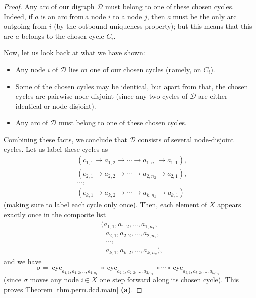 \begin{proof}
Any arc of our digraph $\mathcal{D}$ must belong to one of these chosen
cycles. Indeed, if $a$ is an arc from a node $i$ to a node $j$, then $a$ must
be the only arc outgoing from $i$ (by the outbound uniqueness property); but
this means that this arc $a$ belongs to the chosen cycle $C_{i}$.

Now, let us look back at what we have shown:

\begin{itemize}
\item Any node $i$ of $\mathcal{D}$ lies on one of our chosen cycles (namely,
on $C_{i}$).

\item Some of the chosen cycles may be identical, but apart from that, the
chosen cycles are pairwise node-disjoint (since any two cycles of
$\mathcal{D}$ are either identical or node-disjoint).

\item Any arc of $\mathcal{D}$ must belong to one of these chosen cycles.
\end{itemize}

Combining these facts, we conclude that $\mathcal{D}$ consists of several
node-disjoint cycles. Let us label these cycles as%
\begin{align*}
&  \left(  a_{1,1}\rightarrow a_{1,2}\rightarrow\cdots\rightarrow a_{1,n_{1}%
}\rightarrow a_{1,1}\right)  ,\\
&  \left(  a_{2,1}\rightarrow a_{2,2}\rightarrow\cdots\rightarrow a_{2,n_{2}%
}\rightarrow a_{2,1}\right)  ,\\
&  \ldots,\\
&  \left(  a_{k,1}\rightarrow a_{k,2}\rightarrow\cdots\rightarrow a_{k,n_{k}%
}\rightarrow a_{k,1}\right)
\end{align*}
(making sure to label each cycle only once). Then, each element of $X$ appears
exactly once in the composite list%
\begin{align*}
&  (a_{1,1},a_{1,2},\ldots,a_{1,n_{1}},\\
&  \ \ \ a_{2,1},a_{2,2},\ldots,a_{2,n_{2}},\\
&  \ \ \ \ldots,\\
&  \ \ \ a_{k,1},a_{k,2},\ldots,a_{k,n_{k}}),
\end{align*}
and we have%
\[
\sigma=\operatorname*{cyc}\nolimits_{a_{1,1},a_{1,2},\ldots,a_{1,n_{1}}}%
\circ\operatorname*{cyc}\nolimits_{a_{2,1},a_{2,2},\ldots,a_{2,n_{2}}}%
\circ\cdots\circ\operatorname*{cyc}\nolimits_{a_{k,1},a_{k,2},\ldots
,a_{k,n_{k}}}%
\]
(since $\sigma$ moves any node $i\in X$ one step forward along its chosen
cycle). This proves Theorem \ref{thm.perm.dcd.main} \textbf{(a)}.


\end{proof}
